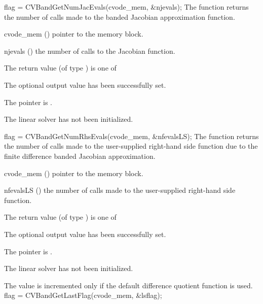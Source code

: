 {
  flag = CVBandGetNumJacEvals(cvode\_mem, \&njevals);
}
{
  The function  returns the
  number of calls made to the banded Jacobian approximation function.
}
{
  \begin{args}
  \item[cvode\_mem] ()
    pointer to the {\cvodes} memory block.
  \item[njevals] ()
    the number of calls to the Jacobian function.
  \end{args}
}
{
  The return value  (of type ) is one of
  \begin{args}
  \item[\Id{CVBAND\_SUCCESS}] 
    The optional output value has been successfully set.
  \item[\Id{CVBAND\_MEM\_NULL}]
    The  pointer is .
  \item[\Id{CVBAND\_LMEM\_NULL}]
    The {\cvband} linear solver has not been initialized.
  \end{args}
}
{}
{
  flag = CVBandGetNumRhsEvals(cvode\_mem, \&nfevalsLS);
}
{
  The function  returns the
  number of calls made to the user-supplied right-hand side function due to the 
  finite difference banded Jacobian approximation.
}
{
  \begin{args}
  \item[cvode\_mem] ()
    pointer to the {\cvodes} memory block.
  \item[nfevalsLS] ()
    the number of calls made to the user-supplied right-hand side function.
  \end{args}
}
{
  The return value  (of type ) is one of
  \begin{args}
  \item[\Id{CVBAND\_SUCCESS}] 
    The optional output value has been successfully set.
  \item[\Id{CVBAND\_MEM\_NULL}]
    The  pointer is .
  \item[\Id{CVBAND\_LMEM\_NULL}]
    The {\cvband} linear solver has not been initialized.
  \end{args}
}
{
  The value  is incremented only if the default 
   difference quotient function is used.
}
{
  flag = CVBandGetLastFlag(cvode\_mem, \&lsflag);
}
